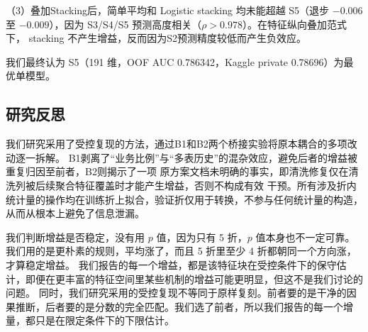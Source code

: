 \documentclass[12pt,UTF8,fontset=windows]{ctexart}
\begin{document}
（3）叠加Stacking后，简单平均和 Logistic stacking 均未能超越 S5（退步
$-0.006$ 至 $-0.009$），因为 S3/S4/S5 预测高度相关（$\rho>0.978$）。在特征纵向叠加范式下，
stacking 不产生增益，反而因为S2预测精度较低而产生负效应。


我们最终认为 S5（191 维，OOF AUC 0.786342，Kaggle private 0.78696）为最优单模型。

\subsection{研究反思}

我们研究采用了受控复现的方法，通过B1和B2两个桥接实验将原本耦合的多项改动逐一拆解。
B1剥离了“业务比例”与“多表历史”的混杂效应，避免后者的增益被重复归因至前者，B2则揭示了一项
原方案文档未明确的事实，即清洗修复仅在清洗列被后续聚合特征覆盖时才能产生增益，否则不构成有效
干预。所有涉及折内统计量的操作均在训练折上拟合，验证折仅用于转换，不参与任何统计量的构造，
从而从根本上避免了信息泄漏。

我们判断增益是否稳定，没有用 $p$ 值，因为只有 5 折，$p$ 值本身也不一定可靠。我们用的是更朴素的规则，平均涨了，而且 5 折里至少 4 折都朝同一个方向涨，才算稳定增益。
我们报告的每一个增益，都是该特征块在受控条件下的保守估计，即便在更丰富的特征空间里某些机制的增益可能更明显，但这不是我们讨论的问题。
同时，我们研究采用的受控复现不等同于原样复刻。前者要的是干净的因果推断，后者要的是分数的完全匹配。我们选了前者，所以我们报告的每一个增量，都只是在限定条件下的下限估计。
\end{document}
